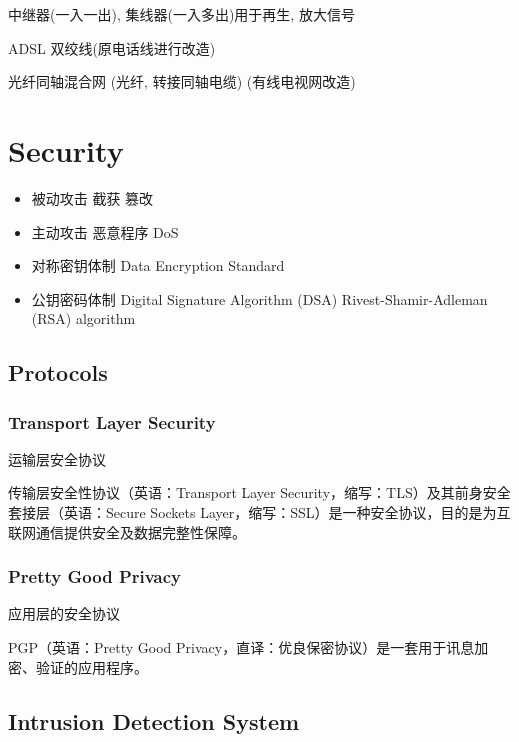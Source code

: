 \documentclass[a4paper]{report}
\begin{document}
中继器(一入一出), 集线器(一入多出)用于再生, 放大信号

ADSL 双绞线(原电话线进行改造) 

光纤同轴混合网 (光纤, 转接同轴电缆) (有线电视网改造)
\chapter{Security}
\begin{itemize}
  \item 被动攻击
  \subitem 截获
  \subitem 篡改
  \item 主动攻击
  \subitem 恶意程序
  \subitem DoS
\end{itemize}

\begin{itemize}
  \item 对称密钥体制 
  \subitem  Data Encryption Standard
  \item 公钥密码体制 
  \subitem Digital Signature Algorithm (DSA​)
  \subitem Rivest-Shamir-Adleman (RSA) algorithm
\end{itemize}

\section{Protocols}
\subsection{Transport Layer Security}
运输层安全协议

传输层安全性协议（英语：Transport Layer Security，缩写：TLS）及其前身安全套接层（英语：Secure Sockets Layer，缩写：SSL）是一种安全协议，目的是为互联网通信提供安全及数据完整性保障。
\subsection{Pretty Good Privacy}
应用层的安全协议

PGP（英语：Pretty Good Privacy，直译：优良保密协议）是一套用于讯息加密、验证的应用程序。
\section{Intrusion Detection System}
\end{document}
